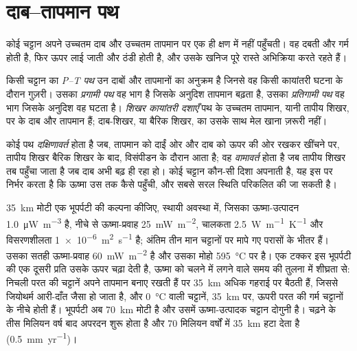 \section{दाब--तापमान पथ}\label{sec:b2:pt-paths:paths}

कोई चट्टान अपने उच्चतम दाब और उच्चतम तापमान पर एक ही क्षण में नहीं पहुँचती।
वह दबती और गर्म होती है, फिर ऊपर लाई जाती और ठंडी होती है, और उसके खनिज पूरे
रास्ते अभिक्रिया करते रहते हैं।

\begin{definition}[P--T पथ; प्रगामी और प्रतिगामी पथ; शिखर कायांतरी दशाएँ]\label{def:b2:pt-paths:paths}
किसी चट्टान का \emph{P--T पथ} उन दाबों और तापमानों का अनुक्रम है
जिनसे वह किसी कायांतरी घटना के दौरान गुज़री। उसका \emph{प्रगामी
पथ} वह भाग है जिसके अनुदिश तापमान बढ़ता है, उसका \emph{प्रतिगामी
पथ} वह भाग जिसके अनुदिश वह घटता है। \emph{शिखर कायांतरी
दशाएँ} पथ के उच्चतम तापमान, यानी तापीय शिखर, पर के दाब और तापमान
हैं; दाब-शिखर, या बैरिक शिखर, का उसके साथ
मेल खाना ज़रूरी नहीं।
\end{definition}

कोई पथ \emph{दक्षिणावर्त} होता है जब, तापमान को दाईं ओर और दाब को ऊपर की ओर रखकर खींचने पर,
तापीय शिखर बैरिक शिखर के बाद, विसंपीडन के दौरान आता है; वह
\emph{वामावर्त} होता है जब तापीय शिखर तब पहुँचा जाता है जब दाब अभी बढ़ ही रहा हो। कोई
चट्टान कौन-सी दिशा अपनाती है, यह इस पर निर्भर करता है कि ऊष्मा उस तक कैसे पहुँची, और सबसे सरल स्थिति
परिकलित की जा सकती है।

\qty{35}{km} मोटी एक भूपर्पटी की कल्पना कीजिए, स्थायी अवस्था में, जिसका ऊष्मा-उत्पादन
\qty{1.0}{\micro W.m^{-3}} है, नीचे से ऊष्मा-प्रवाह \qty{25}{mW.m^{-2}}, चालकता
\qty{2.5}{W.m^{-1}.K^{-1}} और विसरणशीलता \qty{1e-6}{m^2.s^{-1}} है; अंतिम तीन मान
चट्टानों पर मापे गए परासों के भीतर हैं। उसका सतही ऊष्मा-प्रवाह \qty{60}{mW.m^{-2}} है और उसका मोहो
\qty{595}{\celsius} पर है। एक टक्कर इस भूपर्पटी की एक दूसरी प्रति उसके ऊपर चढ़ा देती है, ऊष्मा को
चलने में लगने वाले समय की तुलना में शीघ्रता से: निचली परत की चट्टानें अपने
तापमान बनाए रखती हैं पर \qty{35}{km} अधिक गहराई पर बैठती हैं, जिससे जियोथर्म आरी-दाँत जैसा हो जाता है, और
\qty{0}{\celsius} वाली चट्टानें, \qty{35}{km} पर, ऊपरी परत की गर्म चट्टानों के नीचे होती हैं। भूपर्पटी
अब \qty{70}{km} मोटी है और उसमें ऊष्मा-उत्पादक चट्टान दोगुनी है। चढ़ने के तीस मिलियन वर्ष
बाद अपरदन शुरू होता है और 70 मिलियन वर्षों में \qty{35}{km} हटा देता है
(\qty{0.5}{mm.yr^{-1}})।

